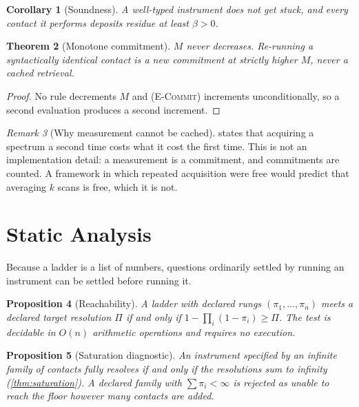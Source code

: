 \documentclass[11pt,a4paper]{article}
\theoremstyle{plain}
\newtheorem{theorem}{Theorem}[section]
\newtheorem{proposition}[theorem]{Proposition}
\newtheorem{corollary}[theorem]{Corollary}
\theoremstyle{definition}
\theoremstyle{remark}
\newtheorem{remark}[theorem]{Remark}
\newcommand{\flo}{\beta}
\newcommand{\pow}{\pi}
\begin{document}
\begin{corollary}[Soundness]
\label{cor:soundness}
A well-typed instrument does not get stuck, and every contact it performs
deposits residue at least $\flo > 0$.
\end{corollary}

\begin{theorem}[Monotone commitment]
\label{thm:monotone}
$M$ never decreases. Re-running a syntactically identical contact is a new
commitment at strictly higher $M$, never a cached retrieval.
\end{theorem}

\begin{proof}
No rule decrements $M$ and \textsc{(E-Commit)} increments unconditionally, so a
second evaluation produces a second increment.
\end{proof}

\begin{remark}[Why measurement cannot be cached]
\label{rem:cache}
 states that acquiring a spectrum a second time costs what it
cost the first time. This is not an implementation detail: a measurement is a
commitment, and commitments are counted. A framework in which repeated
acquisition were free would predict that averaging $k$ scans is free, which it
is not.
\end{remark}

\section{Static Analysis}
\label{sec:static}

Because a ladder is a list of numbers, questions ordinarily settled by running an
instrument can be settled before running it.

\begin{proposition}[Reachability]
\label{prop:reach}
A ladder with declared rungs $(\pow_1,\dots,\pow_n)$ meets a declared target
resolution $\Pi$ if and only if $1-\prod_i(1-\pow_i) \ge \Pi$. The test is
decidable in $O(n)$ arithmetic operations and requires no execution.
\end{proposition}

\begin{proposition}[Saturation diagnostic]
\label{prop:satdiag}
An instrument specified by an infinite family of contacts fully resolves if and
only if the resolutions sum to infinity (\cref{thm:saturation}). A declared
family with $\sum \pow_i < \infty$ is rejected as unable to reach the floor
however many contacts are added.
\end{proposition}
\end{document}

